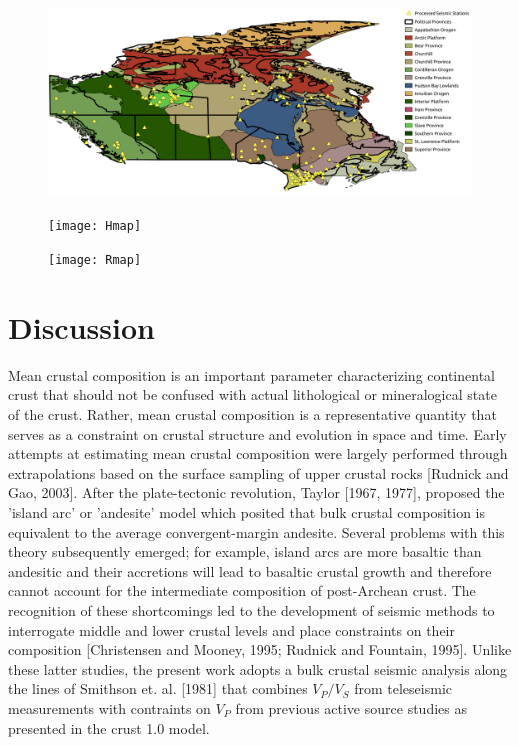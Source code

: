 \documentclass[draft, 12pt]{article}
\begin{document}
\begin{figure}
  \centering
  \includegraphics[width=\textwidth]{stationMap}
  \caption{}
  \label{map:stationMap}
\end{figure}

\begin{figure}
  \centering
  \texttt{[image: Hmap]}
  \caption{}
  \label{map:Hmap}
\end{figure}

\begin{figure}
  \centering
  \texttt{[image: Rmap]}
  \caption{}
  \label{map:Rmap}
\end{figure}



\section{Discussion}

Mean crustal composition is an important parameter characterizing continental crust that should not be confused with actual lithological or mineralogical state
of the crust. Rather, mean crustal composition is a representative quantity that serves as a constraint on crustal structure and evolution in space and time. Early
attempts at estimating mean crustal composition were largely performed through extrapolations based on the surface sampling of upper crustal rocks [Rudnick and Gao, 2003]. After the plate-tectonic revolution, Taylor [1967, 1977], proposed the 'island arc' or 'andesite' model which posited that bulk crustal composition is equivalent to the average convergent-margin andesite. Several problems with this theory subsequently emerged; for example, island arcs are more basaltic than andesitic and their accretions will lead to basaltic crustal growth and therefore cannot account for the intermediate composition of post-Archean crust. The recognition of these shortcomings led to the development of seismic methods to interrogate middle and lower crustal levels and place constraints on their composition [Christensen and Mooney, 1995; Rudnick and Fountain, 1995]. Unlike these latter studies, the present work adopts a bulk crustal seismic analysis along the lines of Smithson et. al. [1981] that combines $V_P/V_S$ from teleseismic measurements with contraints on $V_P$ from previous active source studies as presented in the crust 1.0 model.
\end{document}
